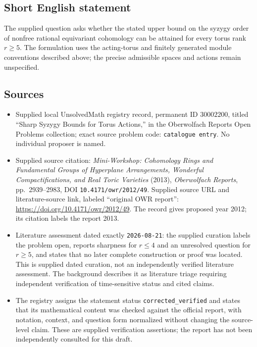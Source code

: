 \documentclass[11pt]{article}
\begin{document}
\subsection{Short English statement}
The supplied question asks whether the stated upper bound on the syzygy order of nonfree rational equivariant cohomology can be attained for every torus rank \(r\geq5\). The formulation uses the acting-torus and finitely generated module conventions described above; the precise admissible spaces and actions remain unspecified.
\subsection{Sources}
\begin{itemize}
\item Supplied local UnsolvedMath registry record, permanent ID \(30002200\), titled ``Sharp Syzygy Bounds for Torus Actions,'' in the Oberwolfach Reports Open Problems collection; exact source problem code: \texttt{catalogue entry}. No individual proposer is named.
\item Supplied source citation: \emph{Mini-Workshop: Cohomology Rings and Fundamental Groups of Hyperplane Arrangements, Wonderful Compactifications, and Real Toric Varieties} (2013), \emph{Oberwolfach Reports}, pp.\ 2939--2983, DOI \texttt{10.4171/owr/2012/49}. Supplied source URL and literature-source link, labeled ``original OWR report'': \url{https://doi.org/10.4171/owr/2012/49}. The record gives proposed year 2012; its citation labels the report 2013.
\item Literature assessment dated exactly \texttt{2026-08-21}: the supplied curation labels the problem open, reports sharpness for \(r\leq4\) and an unresolved question for \(r\geq5\), and states that no later complete construction or proof was located. This is supplied dated curation, not an independently verified literature assessment. The background describes it as literature triage requiring independent verification of time-sensitive status and cited claims.
\item The registry assigns the statement status \texttt{corrected\_verified} and states that its mathematical content was checked against the official report, with notation, context, and question form normalized without changing the source-level claim. These are supplied verification assertions; the report has not been independently consulted for this draft.
\end{itemize}
\end{document}
